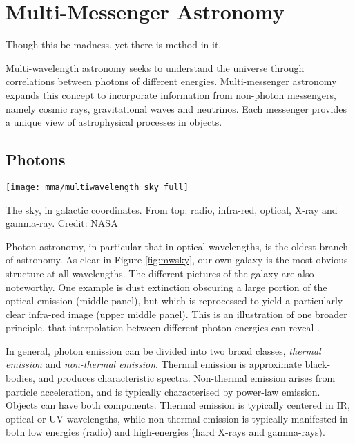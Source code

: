 \setchapterpreamble[u]{\margintoc}
\chapter{Multi-Messenger Astronomy}
\begin{fquote} Though this be madness, yet there is method in it.
\end{fquote}

Multi-wavelength astronomy seeks to understand the universe through correlations between photons of different energies. Multi-messenger astronomy expands this concept to incorporate information from non-photon messengers, namely cosmic rays, gravitational waves and neutrinos. Each messenger provides a unique view of astrophysical processes in objects.

\section{Photons}

\begin{marginfigure}
	\texttt{[image: mma/multiwavelength\_sky\_full]}
	\caption{The sky, in galactic coordinates. From top: radio, infra-red, optical, X-ray and gamma-ray. Credit: NASA}
	\label{fig:mwsky}
\end{marginfigure}

Photon astronomy, in particular that in optical wavelengths, is the oldest branch of astronomy. As clear in Figure \ref{fig:mwsky}, our own galaxy is the most obvious structure at all wavelengths. The different pictures of the galaxy are also noteworthy. One example is dust extinction obscuring a large portion of the optical emission (middle panel), but  which is reprocessed to yield a particularly clear infra-red image (upper middle panel). This is an illustration of one broader principle, that interpolation between different photon energies can reveal .

In general, photon emission can be divided into two broad classes, \emph{thermal emission}
 and \emph{non-thermal emission}. Thermal emission is approximate black-bodies, and produces characteristic spectra. Non-thermal emission arises from particle acceleration, and is typically characterised by power-law emission. Objects can have both components. Thermal emission is typically centered in IR, optical or UV wavelengths, while non-thermal emission is typically manifested in both low energies (radio) and high-energies (hard X-rays and gamma-rays).
 

